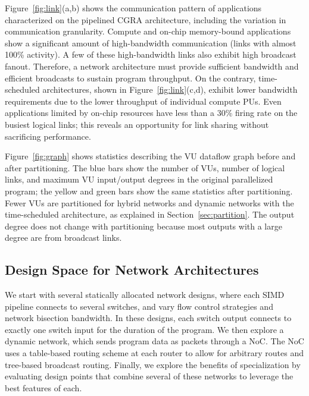 Figure~\ref{fig:link}(a,b) shows the communication pattern of applications
characterized on the pipelined CGRA architecture, including the variation in communication granularity. 
Compute and on-chip memory-bound applications show a significant amount of high-bandwidth communication (links with almost 100\% activity). 
A few of these high-bandwidth links also exhibit high broadcast fanout. 
Therefore, a network architecture must provide sufficient bandwidth and efficient broadcasts to sustain program throughput.
On the contrary, time-scheduled architectures, shown in Figure~\ref{fig:link}(c,d), exhibit
lower bandwidth requirements due to the lower throughput of individual compute PUs. 
Even applications limited by on-chip resources have less than a 30\% firing rate on the busiest logical links; this reveals an opportunity for link sharing without sacrificing performance.

Figure~\ref{fig:graph} shows statistics describing the VU dataflow graph before and after partitioning.
The blue bars show the number of VUs, number of logical links, and maximum VU input/output degrees in the original parallelized program; the yellow and green bars show the same statistics after partitioning. 
Fewer VUs are partitioned for hybrid networks and dynamic networks with the time-scheduled architecture, as explained in Section~\ref{sec:partition}. 
The output degree does not change with partitioning because most outputs with a large degree are from broadcast links.


\subsection{Design Space for Network Architectures} \label{sec:network}

We start with several statically allocated network designs, where each SIMD pipeline connects to several switches, and vary flow control strategies and network bisection bandwidth.
In these designs, each switch output connects to exactly one switch input for the duration of the program.
We then explore a dynamic network, which sends program data as packets through a NoC.
The NoC uses a table-based routing scheme at each router to allow for arbitrary routes and tree-based broadcast routing.
Finally, we explore the benefits of specialization by evaluating design points that combine several of these networks to leverage the best features of each.

